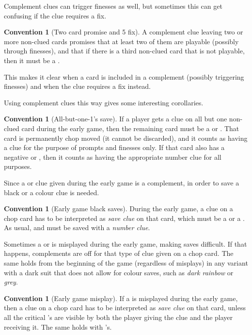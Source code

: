 \documentclass[a4paper]{article}
\theoremstyle{plain}
\theoremstyle{definition}
\newtheorem{convention}[theorem]{Convention}
\begin{document}
Complement clues can trigger finesses as well, but sometimes this can get confusing if the clue requires a fix.

\begin{convention}[Two card promise and 5 fix]
	A complement clue leaving two or more non-clued cards promises that at least two of them are playable (possibly through finesses), and that if there is a third non-clued card that is not playable, then it must be a .
\end{convention}

This makes it clear when a card is included in a complement (possibly triggering finesses) and when the clue requires a fix instead.

Using complement clues this way gives some interesting corollaries.

\begin{convention}[All-but-one-1's save]
	If a player gets a  clue on all but one non-clued card during the early game, then the remaining card must be a  or . That card is permanently chop moved (it cannot be discarded), and it counts as having a  clue for the purpose of prompts and finesses only. If that card also has a negative  or , then it counts as having the appropriate number clue for all purposes.
\end{convention}

Since a  or  clue given during the early game is a complement, in order to save a black  or  a colour clue is needed.

\begin{convention}[Early game black saves]
	During the early game, a  clue on a chop card has to be interpreted as \emph{save clue} on that card, which must be a  or a . As usual,  and  must be saved with a \emph{number clue}.
\end{convention}

Sometimes a  or  is misplayed during the early game, making saves difficult. If that happens, complements are off for that type of clue given on a chop card. The same holds from the beginning of the game (regardless of misplays) in any variant with a dark suit that does not allow for colour saves, such as \emph{dark rainbow} or \emph{grey}.

\begin{convention}[Early game misplay]
	If a  is misplayed during the early game, then a  clue on a chop card has to be interpreted as \emph{save clue} on that card, unless all the critical 's are visible by both the player giving the clue and the player receiving it. The same holds with 's.
\end{convention}
\end{document}
